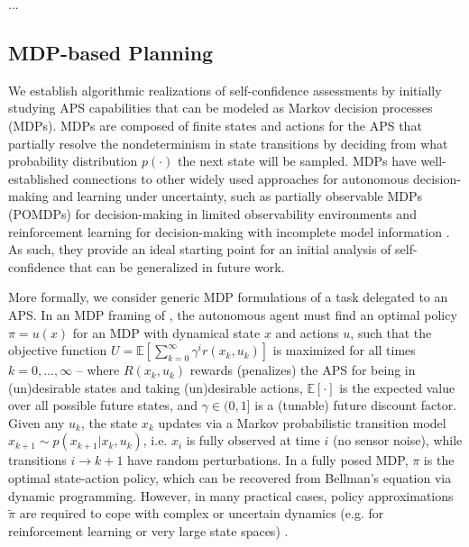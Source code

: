 ...

\subsection{MDP-based Planning} \label{sec:mdp}
We establish algorithmic realizations of self-confidence assessments by initially studying APS capabilities that can be modeled as Markov decision processes (MDPs). MDPs are composed of finite states and actions for the APS that partially resolve the nondeterminism in state transitions by deciding from what probability distribution $p(\cdot)$ the next state will be sampled. %
MDPs have well-established connections to other widely used approaches for autonomous decision-making and learning under uncertainty, such as partially observable MDPs (POMDPs) for decision-making in limited observability environments and reinforcement learning for decision-making with incomplete model information \cite{Kochenderfer2015-uu}. As such, they provide an ideal starting point for an initial analysis of self-confidence that can be generalized in future work. 

More formally, we consider generic MDP formulations of a task \task{} delegated to an APS. In an MDP framing of \task{}, the autonomous agent must find an optimal policy $\pi = u(x)$ for an MDP with dynamical state $x$ and actions $u$, such that the objective function
$U = \mathbb{E} \left[\sum_{k=0}^{\infty} \gamma^i r(x_k,u_k) \right]$ is maximized for all times $k=0,...,\infty$ --  
where $R(x_k,u_k)$ rewards (penalizes) the APS for being in (un)desirable states and taking (un)desirable actions, $\mathbb{E}[\cdot]$ is the expected value over all possible future states, and $\gamma \in (0,1]$ is a (tunable) future discount factor. 
Given any $u_k$, the state $x_k$ updates via a Markov probabilistic transition model $x_{k+1} \sim p(x_{k+1}|x_{k},u_{k})$,  
i.e. $x_{i}$ is fully observed at time $i$ (no sensor noise), while transitions $i\rightarrow k+1$ have random perturbations.
In a fully posed MDP, $\pi$ is the optimal state-action policy, which can be recovered from Bellman's equation via dynamic programming. 
However, in many practical cases, policy approximations $\tilde{\pi}$ are required to cope with complex or uncertain dynamics (e.g. for reinforcement learning or very large state spaces) \cite{Kochenderfer2015-uu}. 
    
